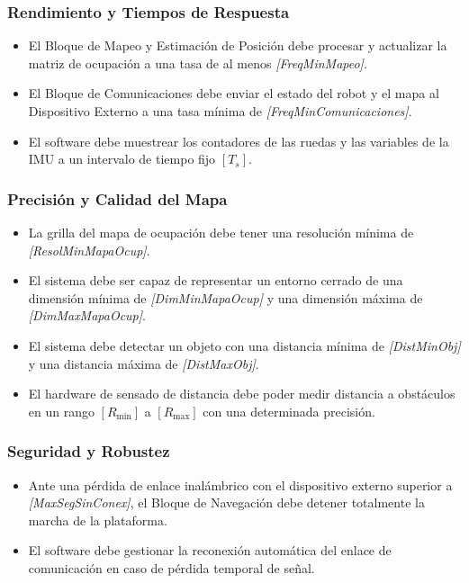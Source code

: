 \documentclass[12pt,a4paper]{article}
\begin{document}
\subsubsection{Rendimiento y Tiempos de Respuesta}
\begin{itemize}
    \item El Bloque de Mapeo y Estimación de Posición debe procesar y actualizar la matriz de ocupación a una tasa de al menos \textit{[FreqMinMapeo]}.
    \item El Bloque de Comunicaciones debe enviar el estado del robot y el mapa al Dispositivo Externo a una tasa mínima de \textit{[FreqMinComunicaciones]}.
    \item El software debe muestrear los contadores de las ruedas y las variables de la IMU a un intervalo de tiempo fijo $[T_s]$.
\end{itemize}

\subsubsection{Precisión y Calidad del Mapa}
\begin{itemize}
    \item La grilla del mapa de ocupación debe tener una resolución mínima de \textit{[ResolMinMapaOcup]}.
    \item El sistema debe ser capaz de representar un entorno cerrado de una dimensión mínima de \textit{[DimMinMapaOcup]} y una dimensión máxima de \textit{[DimMaxMapaOcup]}.
    \item El sistema debe detectar un objeto con una distancia mínima de \textit{[DistMinObj]} y una distancia máxima de \textit{[DistMaxObj]}.
    \item El hardware de sensado de distancia debe poder medir distancia a obstáculos en un rango $[R_{\text{min}}]$ a $[R_{\text{max}}]$ con una determinada precisión.
\end{itemize}

\subsubsection{Seguridad y Robustez}
\begin{itemize}
    \item Ante una pérdida de enlace inalámbrico con el dispositivo externo superior a \textit{[MaxSegSinConex]}, el Bloque de Navegación debe detener totalmente la marcha de la plataforma.
    \item El software debe gestionar la reconexión automática del enlace de comunicación en caso de pérdida temporal de señal.
\end{itemize}
\end{document}
